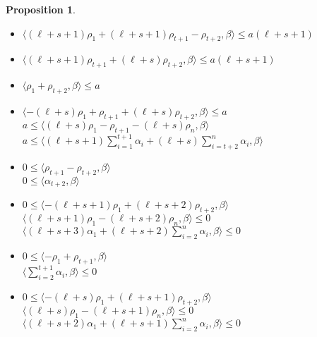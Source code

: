 \documentclass{amsart}
\newtheorem{proposition}[theorem]{Proposition}
\numberwithin{theorem}{section}
\begin{document}
\begin{proposition}
\begin{enumerate}
\begin{itemize}
          \item $\langle (\ell+s+1)\rho_1+(\ell+s+1)\rho_{t+1}-\rho_{t+2}, \beta\rangle \le a(\ell+s+1)$
          \item $\langle (\ell+s+1)\rho_{t+1}+(\ell+s)\rho_{t+2}, \beta\rangle \le a(\ell+s+1)$
          \item $\langle \rho_1+\rho_{t+2}, \beta\rangle \le a$\\
          \item $\langle -(\ell+s)\rho_1+\rho_{t+1}+(\ell+s)\rho_{t+2}, \beta\rangle \le a$\\
            $a \le \langle (\ell+s)\rho_1-\rho_{t+1}-(\ell+s)\rho_n, \beta\rangle$\\
            $a\le \langle (\ell+s+1)\sum_{i=1}^{t+1}\alpha_i+(\ell+s)\sum_{i=t+2}^n\alpha_i, \beta\rangle$\\
          \item $0 \le \langle \rho_{t+1}-\rho_{t+2}, \beta\rangle$\\
            $0 \le \langle \alpha_{t+2}, \beta\rangle$\\
          \item $0 \le \langle -(\ell+s+1)\rho_1+(\ell+s+2)\rho_{t+2}, \beta\rangle$\\
            $\langle (\ell+s+1)\rho_1-(\ell+s+2)\rho_n, \beta\rangle \le 0$\\
            $\langle (\ell+s+3)\alpha_1+(\ell+s+2)\sum_{i=2}^n\alpha_i, \beta\rangle \le 0$\\
          \item $0 \le \langle -\rho_1+\rho_{t+1}, \beta\rangle$\\
            $\langle \sum_{i=2}^{t+1} \alpha_i, \beta\rangle \le 0$\\
          \item $0 \le \langle -(\ell+s)\rho_1+(\ell+s+1)\rho_{t+2}, \beta\rangle$
            $\langle (\ell+s)\rho_1-(\ell+s+1)\rho_n, \beta\rangle \le 0$\\
            $\langle (\ell+s+2)\alpha_1+(\ell+s+1)\sum_{i=2}^n\alpha_i, \beta\rangle \le 0$\\
        \end{itemize}
    \end{enumerate}
  \end{proposition}


  
\end{document}
